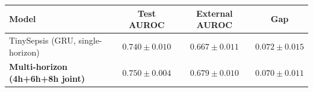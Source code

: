\begin{tabular}{lccc}
\toprule
Model & Test AUROC & External AUROC & Gap \\
\midrule
TinySepsis (GRU, single-horizon) & $0.740 \pm 0.010$ & $0.667 \pm 0.011$ & $0.072 \pm 0.015$ \\
\textbf{Multi-horizon (4h+6h+8h joint)} & $\mathbf{0.750 \pm 0.004}$ & $\mathbf{0.679 \pm 0.010}$ & $0.070 \pm 0.011$ \\
\bottomrule
\end{tabular}
